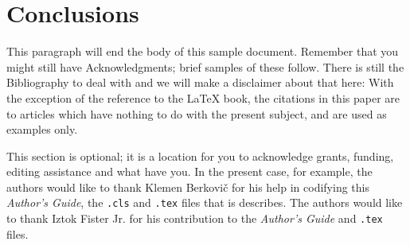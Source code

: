 \documentclass[article,english]{stucosrec}
\newcommand{\latex}{\LaTeX\xspace}
\begin{document}
	\section{Conclusions}
	
	This paragraph will end the body of this sample document.
	Remember that you might still have Acknowledgments; brief samples of these follow.
	There is still the Bibliography to deal with and we will make a disclaimer about that here: With the exception of the reference to the \latex book, the citations in this paper are to articles which have nothing to do with the present subject, and are used as examples only.
	
	\begin{acknowledgment}
		This section is optional; it is a location for you to acknowledge grants, funding, editing assistance and what have you.
		In the present case, for example, the authors would like to thank Klemen Berkovič for his help in codifying this \textit{Author's Guide}, the \texttt{.cls} and \texttt{.tex} files that is describes.
		The authors would like to thank Iztok Fister Jr. for his contribution to the \textit{Author's Guide} and \texttt{.tex} files.
	\end{acknowledgment}

	
	
\end{document}
